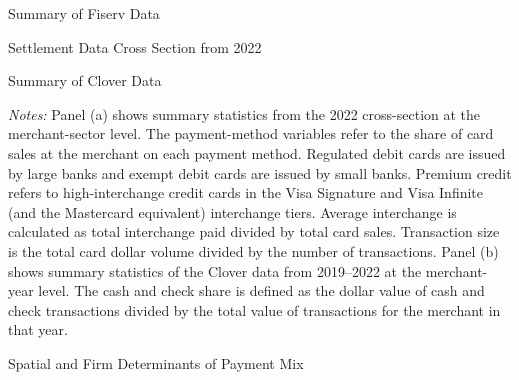 \documentclass[main.tex]{subfiles}
\begin{document}
\begin{table}[H]
  \centering
  \caption{Summary of Fiserv Data}
  \label{tab:fiserv-summary}

  \begin{subtable}[t]{0.95\textwidth}
    \centering
    \caption{Settlement Data Cross Section from 2022}
    \label{tab:settlement-summary}
    \small
    
  \end{subtable}

  \vspace{0.8em}

  \begin{subtable}[t]{0.95\textwidth}
    \centering
    \caption{Summary of Clover Data}
    \label{tab:clover-summary}
    \small
    
  \end{subtable}

  \captionsetup{font=small}
  \vspace{0.4em}
  \begin{minipage}{\linewidth}
    \small\textit{Notes:} Panel (a) shows summary statistics from the 2022 cross-section at the
    merchant-sector level. The payment-method variables refer to the share of card sales at the merchant
    on each payment method. Regulated debit cards are issued by large banks and exempt debit cards are issued
    by small banks. Premium credit refers to high-interchange credit cards in the Visa Signature and Visa
    Infinite (and the Mastercard equivalent) interchange tiers. Average interchange is calculated as total
    interchange paid divided by total card sales. Transaction size is the total card dollar volume divided by the
    number of transactions. Panel (b) shows summary statistics of the Clover data from 2019--2022 at the merchant-year
    level. The cash and check share is defined as the dollar value of cash and check transactions divided
    by the total value of transactions for the merchant in that year.
  \end{minipage}
\end{table}

\clearpage

\begin{table}[H]
\caption{Spatial and Firm Determinants of Payment Mix \label{tab:payment_type}}

\begin{centering}
\small\resizebox{\textwidth}{!}{%
  
}
\par\end{centering}
\end{table}
\end{document}
